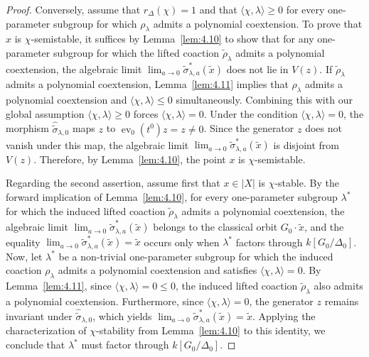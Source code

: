 \documentclass[11pt,a4paper,reqno,noamsfonts]{amsart}
\numberwithin{equation}{section}
\theoremstyle{definition}
\theoremstyle{remark}
\DeclareMathOperator{\ev}{ev}
\begin{document}
\begin{proof}
Conversely, assume that $r_\Delta(\chi) = 1$ and that $\langle \chi, \lambda \rangle \ge 0$ for every one-parameter subgroup for which $\rho_\lambda$ admits a polynomial coextension. To prove that $x$ is $\chi$-semistable, it suffices by Lemma~\ref{lem:4.10} to show that for any one-parameter subgroup for which the lifted coaction $\tilde{\rho}_\lambda$ admits a polynomial coextension, the algebraic limit $\displaystyle\lim_{a \to 0} \tilde{\sigma}_{\lambda,a}^*(\tilde{x})$ does not lie in $V(z)$. If $\tilde{\rho}_\lambda$ admits a polynomial coextension, Lemma~\ref{lem:4.11} implies that $\rho_\lambda$ admits a polynomial coextension and $\langle \chi, \lambda \rangle \le 0$ simultaneously. Combining this with our global assumption $\langle \chi, \lambda \rangle \ge 0$ forces $\langle \chi, \lambda \rangle = 0$. Under the condition $\langle \chi, \lambda \rangle = 0$, the morphism $\hat{\tilde{\sigma}}_{\lambda,0}$ maps $z$ to $\ev_0(t^0) z = z  \neq 0$. Since the generator $z$ does not vanish under this map, the algebraic limit $\displaystyle\lim_{a \to 0} \tilde{\sigma}_{\lambda,a}^*(\tilde{x})$ is disjoint from $V(z)$. Therefore, by Lemma~\ref{lem:4.10}, the point $x$ is $\chi$-semistable.

Regarding the second assertion, assume first that $x \in \lvert X \rvert$ is $\chi$-stable. By the forward implication of Lemma~\ref{lem:4.10}, for every one-parameter subgroup $\lambda^*$ for which the induced lifted coaction $\tilde{\rho}_\lambda$ admits a polynomial coextension, the algebraic limit $\displaystyle\lim_{a \to 0} \tilde{\sigma}_{\lambda,a}^*(\tilde{x})$ belongs to the classical orbit $G_0 \cdot \tilde{x}$, and the equality $\lim_{a \to 0} \tilde{\sigma}_{\lambda,a}^*(\tilde{x}) = \tilde{x}$ occurs only when $\lambda^*$ factors through $k[G_0/\Delta_0]$. Now, let $\lambda^*$ be a non-trivial one-parameter subgroup for which the induced coaction $\rho_\lambda$ admits a polynomial coextension and satisfies $\langle \chi, \lambda \rangle = 0$. By Lemma~\ref{lem:4.11}, since $\langle \chi, \lambda \rangle = 0 \le 0$, the induced lifted coaction $\tilde{\rho}_\lambda$ also admits a polynomial coextension. Furthermore, since $\langle \chi, \lambda \rangle = 0$, the generator $z$ remains invariant under $\hat{\tilde{\sigma}}_{\lambda,0}$, which yields $\displaystyle\lim_{a \to 0} \tilde{\sigma}_{\lambda,a}^*(\tilde{x}) = \tilde{x}$. Applying the characterization of $\chi$-stability from Lemma~\ref{lem:4.10} to this identity, we conclude that $\lambda^*$ must factor through $k[G_0/\Delta_0]$.


\end{proof}
\end{document}
